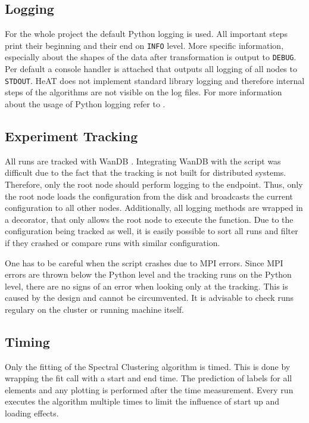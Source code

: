 \subsection{Logging}
\label{subsec:logging}
For the whole project the default Python logging \cite{noauthor_pep_nodate} is used.
All important steps print their beginning and their end on \lstinline{INFO} level.
More specific information, especially about the shapes of the data after transformation is output to \lstinline{DEBUG}.
Per default a console handler is attached that outputs all logging of all nodes to \lstinline{STDOUT}.
\gls{HeAT} does not implement standard library logging and therefore internal steps of the algorithms are not visible on the log files.
For more information about the usage of Python logging refer to \cite{noauthor_pep_nodate}.


\subsection{Experiment Tracking}
\label{subsec:experiment_tracking}
All runs are tracked with WanDB \cite{noauthor_weights_nodate}. Integrating WanDB with the script was difficult due
to the fact that the tracking is not built for distributed systems. Therefore, only the root node should perform
logging to the endpoint.
Thus, only the root node loads the configuration from the disk and broadcasts the current configuration
to all other nodes.
Additionally, all logging methods are wrapped in a decorator, that only allows the root node to execute the function.
Due to the configuration being tracked as well, it is easily possible to sort all runs and filter if they crashed or
compare runs with similar configuration.

One has to be careful when the script crashes due to \gls{MPI} errors. Since \gls{MPI} errors are thrown
below the Python level and the tracking runs on the Python level, there are no signs of an error when looking only at
the tracking. This is caused by the design and cannot be circumvented. It is advisable to check runs regulary on
the cluster or running machine itself.

\subsection{Timing}
\label{subsec:timing}
Only the fitting of the Spectral Clustering algorithm is timed. This is done by wrapping the fit call with a start
and end time. The prediction of labels for all elements and any plotting is performed after the time measurement.
Every run executes the algorithm multiple times to limit the influence of start up and loading effects.
